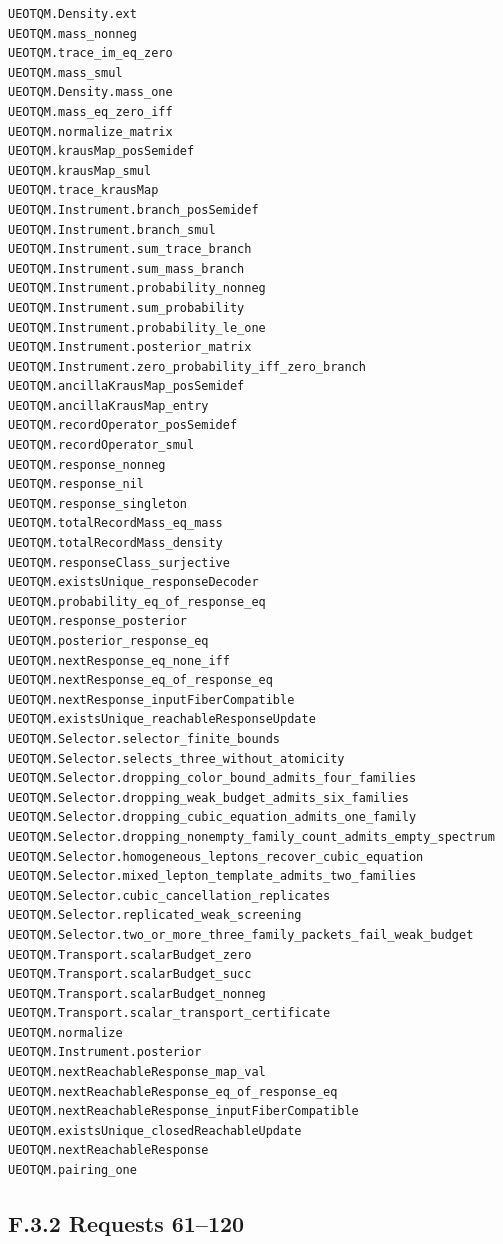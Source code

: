 \documentclass[
  11pt,
  oneside]{book}
\begin{document}
\begin{Verbatim}[breaklines,breakanywhere,fontsize=\scriptsize]
UEOTQM.Density.ext
UEOTQM.mass_nonneg
UEOTQM.trace_im_eq_zero
UEOTQM.mass_smul
UEOTQM.Density.mass_one
UEOTQM.mass_eq_zero_iff
UEOTQM.normalize_matrix
UEOTQM.krausMap_posSemidef
UEOTQM.krausMap_smul
UEOTQM.trace_krausMap
UEOTQM.Instrument.branch_posSemidef
UEOTQM.Instrument.branch_smul
UEOTQM.Instrument.sum_trace_branch
UEOTQM.Instrument.sum_mass_branch
UEOTQM.Instrument.probability_nonneg
UEOTQM.Instrument.sum_probability
UEOTQM.Instrument.probability_le_one
UEOTQM.Instrument.posterior_matrix
UEOTQM.Instrument.zero_probability_iff_zero_branch
UEOTQM.ancillaKrausMap_posSemidef
UEOTQM.ancillaKrausMap_entry
UEOTQM.recordOperator_posSemidef
UEOTQM.recordOperator_smul
UEOTQM.response_nonneg
UEOTQM.response_nil
UEOTQM.response_singleton
UEOTQM.totalRecordMass_eq_mass
UEOTQM.totalRecordMass_density
UEOTQM.responseClass_surjective
UEOTQM.existsUnique_responseDecoder
UEOTQM.probability_eq_of_response_eq
UEOTQM.response_posterior
UEOTQM.posterior_response_eq
UEOTQM.nextResponse_eq_none_iff
UEOTQM.nextResponse_eq_of_response_eq
UEOTQM.nextResponse_inputFiberCompatible
UEOTQM.existsUnique_reachableResponseUpdate
UEOTQM.Selector.selector_finite_bounds
UEOTQM.Selector.selects_three_without_atomicity
UEOTQM.Selector.dropping_color_bound_admits_four_families
UEOTQM.Selector.dropping_weak_budget_admits_six_families
UEOTQM.Selector.dropping_cubic_equation_admits_one_family
UEOTQM.Selector.dropping_nonempty_family_count_admits_empty_spectrum
UEOTQM.Selector.homogeneous_leptons_recover_cubic_equation
UEOTQM.Selector.mixed_lepton_template_admits_two_families
UEOTQM.Selector.cubic_cancellation_replicates
UEOTQM.Selector.replicated_weak_screening
UEOTQM.Selector.two_or_more_three_family_packets_fail_weak_budget
UEOTQM.Transport.scalarBudget_zero
UEOTQM.Transport.scalarBudget_succ
UEOTQM.Transport.scalarBudget_nonneg
UEOTQM.Transport.scalar_transport_certificate
UEOTQM.normalize
UEOTQM.Instrument.posterior
UEOTQM.nextReachableResponse_map_val
UEOTQM.nextReachableResponse_eq_of_response_eq
UEOTQM.nextReachableResponse_inputFiberCompatible
UEOTQM.existsUnique_closedReachableUpdate
UEOTQM.nextReachableResponse
UEOTQM.pairing_one
\end{Verbatim}

\subsection{F.3.2 Requests 61--120}
\end{document}
